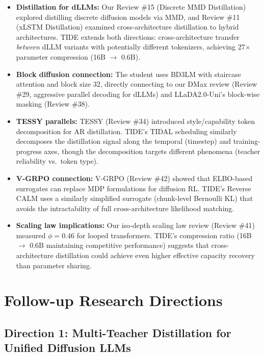 \documentclass[11pt]{article}
\begin{document}
\begin{itemize}
    \item \textbf{Distillation for dLLMs:} Our Review \#15 (Discrete MMD Distillation) explored distilling discrete diffusion models via MMD, and Review \#11 (xLSTM Distillation) examined cross-architecture distillation to hybrid architectures. TIDE extends both directions: cross-architecture transfer \emph{between} dLLM variants with potentially different tokenizers, achieving 27$\times$ parameter compression (16B $\to$ 0.6B).
    \item \textbf{Block diffusion connection:} The student uses BD3LM with staircase attention and block size 32, directly connecting to our DMax review (Review \#29, aggressive parallel decoding for dLLMs) and LLaDA2.0-Uni's block-wise masking (Review \#38).
    \item \textbf{TESSY parallels:} TESSY (Review \#34) introduced style/capability token decomposition for AR distillation. TIDE's TIDAL scheduling similarly decomposes the distillation signal along the temporal (timestep) and training-progress axes, though the decomposition targets different phenomena (teacher reliability vs.\ token type).
    \item \textbf{V-GRPO connection:} V-GRPO (Review \#42) showed that ELBO-based surrogates can replace MDP formulations for diffusion RL. TIDE's Reverse CALM uses a similarly simplified surrogate (chunk-level Bernoulli KL) that avoids the intractability of full cross-architecture likelihood matching.
    \item \textbf{Scaling law implications:} Our iso-depth scaling law review (Review \#41) measured $\phi = 0.46$ for looped transformers. TIDE's compression ratio (16B $\to$ 0.6B maintaining competitive performance) suggests that cross-architecture distillation could achieve even higher effective capacity recovery than parameter sharing.
\end{itemize}

\section{Follow-up Research Directions}

\subsection{Direction 1: Multi-Teacher Distillation for Unified Diffusion LLMs}
\end{document}
